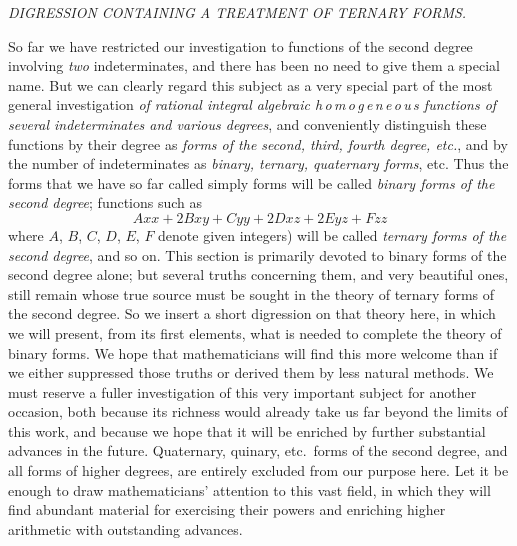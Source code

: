 \begin{center}
\textit{DIGRESSION CONTAINING A TREATMENT OF TERNARY FORMS.}
\end{center}

So far we have restricted our investigation to functions of the second degree involving \textit{two} indeterminates, and there has been no need to give them a special name. But we can clearly regard this subject as a very special part of the most general investigation \textit{of rational integral algebraic h\,o\,m\,o\,g\,e\,n\,e\,o\,u\,s functions of several indeterminates and various degrees}, and conveniently distinguish these functions by their degree as \textit{forms of the second, third, fourth degree, etc.}, and by the number of indeterminates as \textit{binary, ternary, quaternary forms}, etc. Thus the forms that we have so far called simply forms will be called \textit{binary forms of the second degree}; functions such as
\[
Axx+2Bxy+Cyy+2Dxz+2Eyz+Fzz
\]
where $A$, $B$, $C$, $D$, $E$, $F$ denote given integers) will be called \textit{ternary forms of the second degree}, and so on. This section is primarily devoted to binary forms of the second degree alone; but several truths concerning them, and very beautiful ones, still remain whose true source must be sought in the theory of ternary forms of the second degree. So we insert a short digression on that theory here, in which we will present, from its first elements, what is needed to complete the theory of binary forms. We hope that mathematicians will find this more welcome than if we either suppressed those truths or derived them by less natural methods. We must reserve a fuller investigation of this very important subject for another occasion, both because its richness would already take us far beyond the limits of this work, and because we hope that it will be enriched by further substantial advances in the future. Quaternary, quinary, etc.\ forms of the second degree, and all forms of higher degrees, are entirely excluded from our purpose here. Let it be enough to draw mathematicians' attention to this vast field, in which they will find abundant material for exercising their powers and enriching higher arithmetic with outstanding advances.

